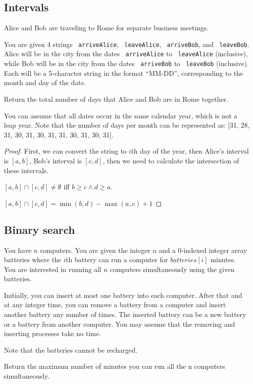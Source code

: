 \documentclass[11pt]{article}
\let\OldTexttt\texttt
\renewcommand{\texttt}[1]{\OldTexttt{\color{MidnightBlue} #1}}
\begin{document}
\subsection{Intervals}
\label{sec:orga0e16ae}
\begin{problem}
Alice and Bob are traveling to Rome for separate business meetings.

You are given 4 strings \texttt{arriveAlice}, \texttt{leaveAlice}, \texttt{arriveBob}, and \texttt{leaveBob}. Alice will be in the
city from the dates \texttt{arriveAlice} to \texttt{leaveAlice} (inclusive), while Bob will be in the city from
the dates \texttt{arriveBob} to \texttt{leaveBob} (inclusive). Each will be a 5-character string in the format
``MM-DD'', corresponding to the month and day of the date.

Return the total number of days that Alice and Bob are in Rome together.

You can assume that all dates occur in the same calendar year, which is not a leap year. Note
that the number of days  per month can be represented as: [31, 28, 31, 30, 31, 30, 31, 31, 30, 31, 30, 31].
\end{problem}

\begin{proof}
First, we can convert the string to \(i\)th day of the year, then Alice's interval is \([a,b]\),
Bob's interval is \([c,d]\), then we need to calculate the intersection of these intervals.

\([a,b]\cap[c,d]\neq\emptyset\) iff \(b\ge c\wedge d\ge a\).

\([a,b]\cap[c,d]=\min(b,d)-\max(a,c)+1\)
\end{proof}

\subsection{Binary search}
\label{sec:orgeba42f8}
\begin{problem}
You have \(n\) computers. You are given the integer \(n\) and a 0-indexed integer array batteries where
the \(i\)th battery can run a computer for \(batteries[i]\) minutes. You are interested in running all \(n\)
computers simultaneously using the given batteries.

Initially, you can insert at most one battery into each computer. After that and at any integer
time, you can remove a battery from a computer and insert another battery any number of
times. The inserted battery can be a new battery or a battery from another computer. You
may assume that the removing and inserting processes take no time.

Note that the batteries cannot be recharged.

Return the maximum number of minutes you can run all the n computers simultaneously.
\end{problem}
\end{document}
